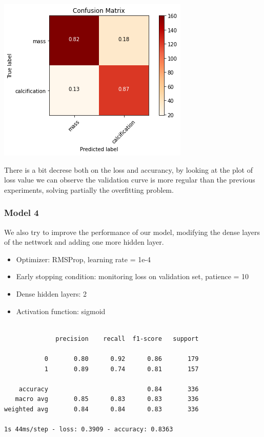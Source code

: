 \documentclass{article}
\begin{document}
\begin{center}
\begin{minipage}{0.45\textwidth}
        \includegraphics[scale=0.6]{./img/cmScratchDrop.png}
    \end{minipage}
\end{center}
There is a bit decrese both on the loss and accurancy, by looking at the plot of loss value we can observe the validation curve is more regular than the previous experiments, solving partially the overfitting problem.

\subsubsection{Model 4}
We also try to improve the performance of our model, modifying the dense layers of the nettwork and adding one more hidden layer.
\begin{itemize}
\item Optimizer: RMSProp, learning rate = 1e-4
\item Early stopping condition: monitoring loss on validation set, patience = 10
\item Dense hidden layers: 2
\item Activation function: sigmoid
\end{itemize}

\begin {verbatim}

              precision    recall  f1-score   support

           0       0.80      0.92      0.86       179
           1       0.89      0.74      0.81       157

    accuracy                           0.84       336
   macro avg       0.85      0.83      0.83       336
weighted avg       0.84      0.84      0.83       336

1s 44ms/step - loss: 0.3909 - accuracy: 0.8363

\end{verbatim}
\end{document}
